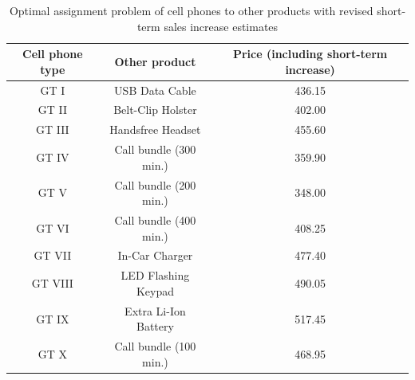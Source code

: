\begin{enumerate}[(a)]
\begin{table}[H]
	\centering
	\caption{Optimal assignment problem of cell phones to other products with revised short-term sales increase estimates}
	\begin{tabular}{|c|c|c|}\hline
Cell phone type & Other product & Price (including short-term increase) \\ \hline
GT I & USB Data Cable & 436.15 \\
GT II & Belt-Clip Holster & 402.00 \\
GT III & Handsfree Headset & 455.60 \\
GT IV & Call bundle (300 min.) & 359.90 \\
GT V & Call bundle (200 min.) & 348.00 \\
GT VI & Call bundle (400 min.) & 408.25 \\
GT VII & In-Car Charger & 477.40 \\
GT VIII & LED Flashing Keypad & 490.05 \\
GT IX & Extra Li-Ion Battery & 517.45 \\
GT X & Call bundle (100 min.) & 468.95 \\
\hline
	\end{tabular}
	\label{hungarian-5-e}
\end{table}

\end{enumerate}
